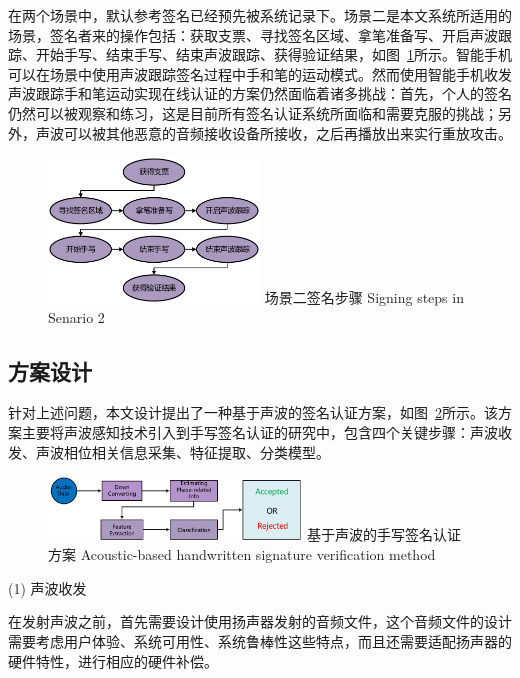 在两个场景中，默认参考签名已经预先被系统记录下。场景二是本文系统所适用的场景，签名者来的操作包括：获取支票、寻找签名区域、拿笔准备写、开启声波跟踪、开始手写、结束手写、结束声波跟踪、获得验证结果，如图~\ref{fig:signing-steps}所示。智能手机可以在场景中使用声波跟踪签名过程中手和笔的运动模式。然而使用智能手机收发声波跟踪手和笔运动实现在线认证的方案仍然面临着诸多挑战：首先，个人的签名仍然可以被观察和练习，这是目前所有签名认证系统所面临和需要克服的挑战；另外，声波可以被其他恶意的音频接收设备所接收，之后再播放出来实行重放攻击。
\begin{figure}[!htp]
  \centering
  \includegraphics[width=0.5\textwidth]{figure/senario-actions}
  \bicaption
    {场景二签名步骤}
    {Signing steps in Senario 2}
  \label{fig:signing-steps}
\end{figure}

\subsection{方案设计}
针对上述问题，本文设计提出了一种基于声波的签名认证方案，如图~\ref{fig:acoustic-hsv-method}所示。该方案主要将声波感知技术引入到手写签名认证的研究中，包含四个关键步骤：声波收发、声波相位相关信息采集、特征提取、分类模型。
\begin{figure}[!htp]
  \centering
  \includegraphics[width=0.6\textwidth]{figure/system-architecture.pdf}
  \bicaption
    {基于声波的手写签名认证方案}
    {Acoustic-based handwritten signature verification method}
  \label{fig:acoustic-hsv-method}
\end{figure}

(1) 声波收发

在发射声波之前，首先需要设计使用扬声器发射的音频文件，这个音频文件的设计需要考虑用户体验、系统可用性、系统鲁棒性这些特点，而且还需要适配扬声器的硬件特性，进行相应的硬件补偿。


